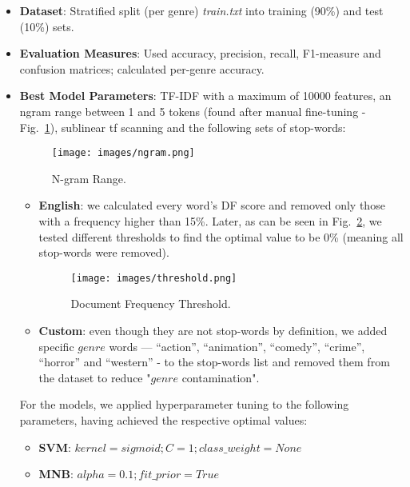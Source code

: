\documentclass[3pt, sigconf, nonacm]{acmart}
\begin{document}
\begin{itemize}
    \item \textbf{Dataset}: Stratified split (per genre) \textit{train.txt} into training (90\%) and test (10\%) sets.
    \item \textbf{Evaluation Measures}: Used accuracy, precision, recall, F1-measure and confusion matrices; calculated per-genre accuracy.
    \item \textbf{Best Model Parameters}: TF-IDF with a maximum of 10000 features, an ngram range between 1 and 5 tokens (found after manual fine-tuning - Fig.~\ref{fig:ngram}), sublinear tf scanning and the following sets of stop-words:
    \begin{figure}[h]
        \centering
        \texttt{[image: images/ngram.png]}
        \caption{\footnotesize N-gram Range.}
        \Description{~}
        \label{fig:ngram}
    \end{figure}
    \begin{itemize}
        \item \textbf{English}: we calculated every word's DF score and removed only those with a frequency higher than 15\%. Later, as can be seen in Fig.~\ref{fig:threshold}, we tested different thresholds to find the optimal value to be 0\% (meaning all stop-words were removed).
        \begin{figure}[h]
            \centering
            \texttt{[image: images/threshold.png]}
            \caption{\footnotesize Document Frequency Threshold.}
            \Description{~}
            \label{fig:threshold}
        \end{figure}

        \item \textbf{Custom}: even though they are not stop-words by definition, we added specific $genre$ words —  ``action'', ``animation'', ``comedy'', ``crime'', ``horror'' and ``western'' - to the stop-words list and removed them from the dataset to reduce "$genre$ contamination".
    \end{itemize}
    For the models, we applied hyperparameter tuning to the following parameters, having achieved the respective optimal values:
    \begin{itemize}
        \item \textbf{SVM}: $kernel = sigmoid; C = 1; class\_weight = None$
        \item \textbf{MNB}: $alpha = 0.1; fit\_prior = True$
    \end{itemize}
\end{itemize}
\end{document}
